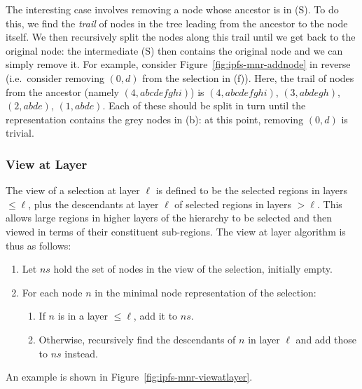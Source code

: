 The interesting case involves removing a node whose ancestor is in (S). To do this, we find the \emph{trail} of nodes in the tree leading from the ancestor to the node itself. We then recursively split the nodes along this trail until we get back to the original node: the intermediate (S) then contains the original node and we can simply remove it. For example, consider Figure~\ref{fig:ipfs-mnr-addnode} in reverse (i.e.~consider removing $(0,d)$ from the selection in (f)). Here, the trail of nodes from the ancestor (namely $(4,\mathit{abcdefghi})$) is $(4,\mathit{abcdefghi})$, $(3,\mathit{abdegh})$, $(2,\mathit{abde})$, $(1,\mathit{abde})$. Each of these should be split in turn until the representation contains the grey nodes in (b): at this point, removing $(0,d)$ is trivial.

\subsubsection{View at Layer}

The view of a selection at layer $\ell$ is defined to be the selected regions in layers $\le \ell$, plus the descendants at layer $\ell$ of selected regions in layers $> \ell$. This allows large regions in higher layers of the hierarchy to be selected and then viewed in terms of their constituent sub-regions. The view at layer algorithm is thus as follows:

\begin{enumerate}

\item Let $\mathit{ns}$ hold the set of nodes in the view of the selection, initially empty.
\item For each node $n$ in the minimal node representation of the selection:

\begin{enumerate}
\item If $n$ is in a layer $\le \ell$, add it to $\mathit{ns}$.
\item Otherwise, recursively find the descendants of $n$ in layer $\ell$ and add those to $\mathit{ns}$ instead.
\end{enumerate}

\end{enumerate}

An example is shown in Figure~\ref{fig:ipfs-mnr-viewatlayer}.

